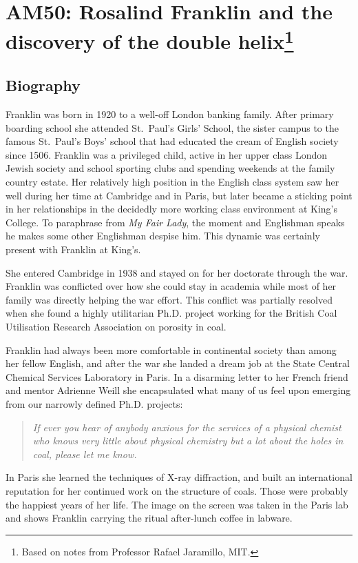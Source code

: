 \documentclass[12pt]{article}
\begin{document}
\section*{AM50: Rosalind Franklin and the discovery of the double helix\footnote{Based on notes from Professor Rafael Jaramillo, MIT.}}
\subsection*{Biography}
Franklin was born in 1920 to a well-off London banking family.  After primary
boarding school she attended St.~Paul's Girls' School, the sister campus to the
famous St.~Paul's Boys' school that had educated the cream of English society
since 1506. Franklin was a privileged child, active in her upper class London
Jewish society and school sporting clubs and spending weekends at the family
country estate. Her relatively high position in the English class system saw
her well during her time at Cambridge and in Paris, but later became a sticking
point in her relationships in the decidedly more working class environment at
King's College. To paraphrase from {\it My Fair Lady}, the moment and
Englishman speaks he makes some other Englishman despise him. This dynamic was
certainly present with Franklin at King's.

She entered Cambridge in 1938 and stayed on for her doctorate through the war.
Franklin was conflicted over how she could stay in academia while most of her
family was directly helping the war effort. This conflict was partially
resolved when she found a highly utilitarian Ph.D. project working for the
British Coal Utilisation Research Association on porosity in coal.

Franklin had always been more comfortable in continental society than among her
fellow English, and after the war she landed a dream job at the State Central
Chemical Services Laboratory in Paris. In a disarming letter to her French
friend and mentor Adrienne Weill she encapsulated what many of us feel upon
emerging from our narrowly defined Ph.D. projects:
\begin{quotation}
  {\it If ever you hear of anybody anxious for the services of a physical
  chemist who knows very little about physical chemistry but a lot about the
  holes in coal, please let me know.}
\end{quotation}
In Paris she learned the techniques of X-ray diffraction, and built an
international reputation for her continued work on the structure of coals.
Those were probably the happiest years of her life. The image on the screen was
taken in the Paris lab and shows Franklin carrying the ritual after-lunch
coffee in labware.
\end{document}

